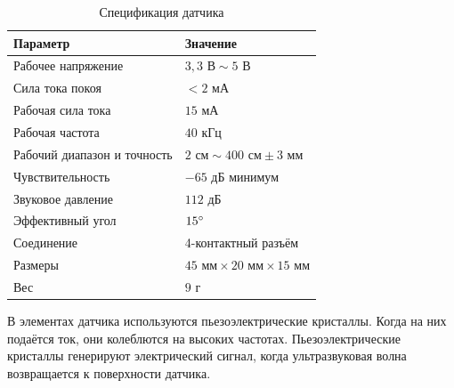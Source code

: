 \documentclass[a4paper, 14pt]{article}
\begin{document}
\begin{table}[h!]
	\centering
	\begin{tabular}{ll}
		\toprule
		\textbf{Параметр}           & \textbf{Значение}                                           \\
		\midrule
		Рабочее напряжение          & \(3,3 \text{ В} \sim 5 \text{ В}\)                          \\
		Сила тока покоя             & \(<2\text{ мА}\)                                            \\
		Рабочая сила тока           & \(15\text{ мА}\)                                            \\
		Рабочая частота             & \(40\text{ кГц}\)                                           \\
		Рабочий диапазон и точность & \(2 \text{ см} \sim 400 \text{ см} \pm 3 \text{ мм}\)       \\
		Чувствительность            & \(-65 \text{ дБ}\) минимум                                  \\
		Звуковое давление           & \(112 \text{ дБ}\)                                          \\
		Эффективный угол            & \(15 \degree\)                                              \\
		Соединение                  & 4-контактный разъём                                         \\
		Размеры                     & \(45 \text{ мм} \times 20 \text{ мм} \times 15 \text{ мм}\) \\
		Вес                         & \(9 \text{ г}\)                                             \\
		\bottomrule
	\end{tabular}
	\caption{Спецификация датчика}
\end{table}

В элементах датчика используются пьезоэлектрические кристаллы.
Когда на них подаётся ток, они колеблются на высоких частотах.
Пьезоэлектрические кристаллы генерируют электрический сигнал, когда
ультразвуковая волна возвращается к поверхности датчика.
\end{document}
